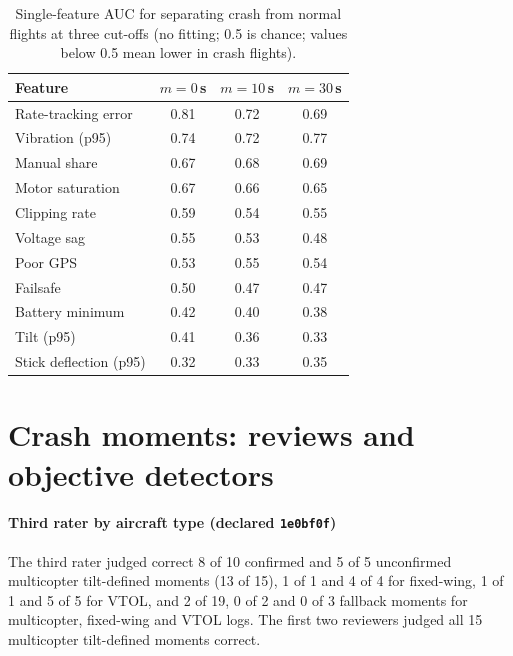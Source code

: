 \documentclass[preprint,12pt]{elsarticle}
\begin{document}
\begin{table}[t]
\centering
\caption{Single-feature AUC for separating crash from normal flights at three cut-offs (no fitting; 0.5 is chance;
values below 0.5 mean lower in crash flights).}
\label{tab:features_auc}
\small
\begin{tabular}{@{}lccc@{}}
\toprule
Feature & $m=0$\,s & $m=10$\,s & $m=30$\,s \\
\midrule
Rate-tracking error & 0.81 & 0.72 & 0.69 \\
Vibration (p95) & 0.74 & 0.72 & 0.77 \\
Manual share & 0.67 & 0.68 & 0.69 \\
Motor saturation & 0.67 & 0.66 & 0.65 \\
Clipping rate & 0.59 & 0.54 & 0.55 \\
Voltage sag & 0.55 & 0.53 & 0.48 \\
Poor GPS & 0.53 & 0.55 & 0.54 \\
Failsafe & 0.50 & 0.47 & 0.47 \\
Battery minimum & 0.42 & 0.40 & 0.38 \\
Tilt (p95) & 0.41 & 0.36 & 0.33 \\
Stick deflection (p95) & 0.32 & 0.33 & 0.35 \\
\bottomrule
\end{tabular}
\end{table}
\FloatBarrier

\section{Crash moments: reviews and objective detectors}
\label{sup:moment}
\paragraph{Third rater by aircraft type (declared \texttt{1e0bf0f})} The third rater judged correct 8 of 10 confirmed and 5 of 5 unconfirmed multicopter tilt-defined moments (13 of 15), 1 of 1 and 4 of 4 for fixed-wing, 1 of 1 and 5 of 5 for VTOL, and 2 of 19, 0 of 2 and 0 of 3 fallback moments for multicopter, fixed-wing and VTOL logs. The first two reviewers judged all 15 multicopter tilt-defined moments correct.
\end{document}
